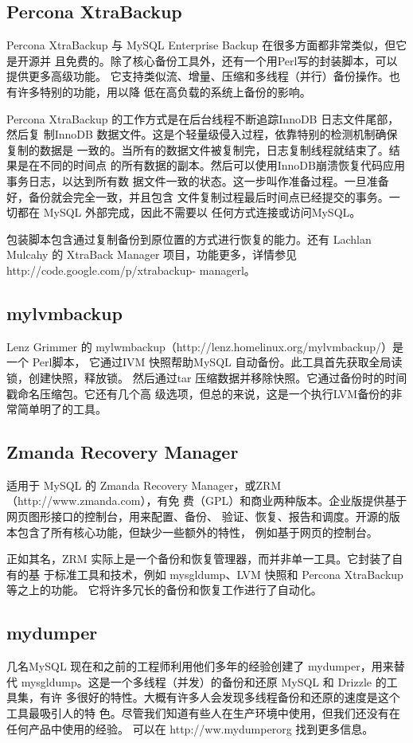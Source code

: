 \subsection{Percona XtraBackup}
Percona XtraBackup 与 MySQL Enterprise Backup 在很多方面都非常类似，但它是开源并
且免费的。除了核心备份工具外，还有一个用Perl写的封装脚本，可以提供更多高级功能。
它支持类似流、增量、压缩和多线程（并行）备份操作。也有许多特别的功能，用以降
低在高负载的系统上备份的影响。

Percona XtraBackup 的工作方式是在后台线程不断追踪InnoDB 日志文件尾部，然后复
制InnoDB 数据文件。这是个轻量级侵入过程，依靠特别的检测机制确保复制的数据是
一致的。当所有的数据文件被复制完，日志复制线程就结束了。结果是在不同的时间点
的所有数据的副本。然后可以使用InnoDB崩溃恢复代码应用事务日志，以达到所有数
据文件一致的状态。这一步叫作准备过程。一旦准备好，备份就会完全一致，并且包含
文件复制过程最后时间点已经提交的事务。一切都在 MySQL 外部完成，因此不需要以
任何方式连接或访问MySQL。

包装脚本包含通过复制备份到原位置的方式进行恢复的能力。还有 Lachlan Mulcahy
的 XtraBack Manager 项目，功能更多，详情参见 http://code.google.com/p/xtrabackup-
managerl。

\subsection{mylvmbackup}
Lenz Grimmer 的 mylwmbackup（http://lenz.homelinux.org/mylvmbackup/）是一个 Perl脚本，
它通过IVM 快照帮助MySQL 自动备份。此工具首先获取全局读锁，创建快照，释放锁。
然后通过tar 压缩数据并移除快照。它通过备份时的时间戳命名压缩包。它还有几个高
级选项，但总的来说，这是一个执行LVM备份的非常简单明了的工具。

\subsection{Zmanda Recovery Manager}
适用于 MySQL 的 Zmanda Recovery Manager，或ZRM （http://www.zmanda.com），有免
费（GPL）和商业两种版本。企业版提供基于网页图形接口的控制台，用来配置、备份、
验证、恢复、报告和调度。开源的版本包含了所有核心功能，但缺少一些额外的特性，
例如基于网页的控制台。

正如其名，ZRM 实际上是一个备份和恢复管理器，而并非单一工具。它封装了自有的基
于标准工具和技术，例如 mysgldump、LVM 快照和 Percona XtraBackup 等之上的功能。
它将许多冗长的备份和恢复工作进行了自动化。

\subsection{mydumper}
几名MySQL 现在和之前的工程师利用他们多年的经验创建了 mydumper，用来替代
mysgldump。这是一个多线程（并发）的备份和还原 MySQL 和 Drizzle 的工具集，有许
多很好的特性。大概有许多人会发现多线程备份和还原的速度是这个工具最吸引人的特
色。尽管我们知道有些人在生产环境中使用，但我们还没有在任何产品中使用的经验。
可以在 http://ww.mydumperorg 找到更多信息。

